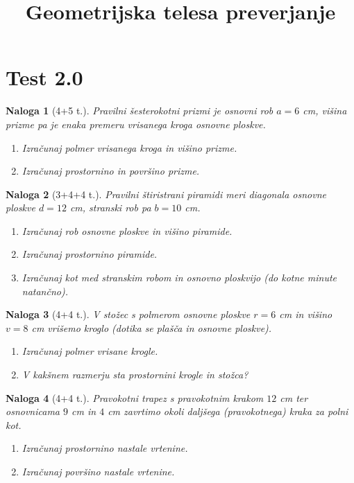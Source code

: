 \documentclass[a4paper,12pt]{article}
\title{Geometrijska telesa preverjanje}
\author{}
\date{}
\theoremstyle{naloga}
\newtheorem{naloga}{Naloga}[section]
\begin{document}
\maketitle

\section{Test 2.0}

\begin{naloga}[4+5 t.]
Pravilni šesterokotni prizmi je osnovni rob $a=6$ cm, višina prizme pa je enaka premeru vrisanega kroga osnovne ploskve.
\begin{enumerate}
\item Izračunaj polmer vrisanega kroga in višino prizme.
\item Izračunaj prostornino in površino prizme.
\end{enumerate}
\end{naloga}

\begin{naloga}[3+4+4 t.]
Pravilni štiristrani piramidi meri diagonala osnovne ploskve $d=12$ cm, stranski rob pa $b=10$ cm.
\begin{enumerate}
\item Izračunaj rob osnovne ploskve in višino piramide.
\item Izračunaj prostornino piramide.
\item Izračunaj kot med stranskim robom in osnovno ploskvijo (do kotne minute natančno).
\end{enumerate}
\end{naloga}

\begin{naloga}[4+4 t.]
V stožec s polmerom osnovne ploskve $r=6$ cm in višino $v=8$ cm vrišemo kroglo (dotika se plašča in osnovne ploskve).
\begin{enumerate}
\item Izračunaj polmer vrisane krogle.
\item V kakšnem razmerju sta prostornini krogle in stožca?
\end{enumerate}
\end{naloga}

\begin{naloga}[4+4 t.]
Pravokotni trapez s pravokotnim krakom $12$ cm ter osnovnicama $9$ cm in $4$ cm zavrtimo okoli daljšega (pravokotnega) kraka za polni kot.
\begin{enumerate}
\item Izračunaj prostornino nastale vrtenine.
\item Izračunaj površino nastale vrtenine.
\end{enumerate}
\end{naloga}
\end{document}
